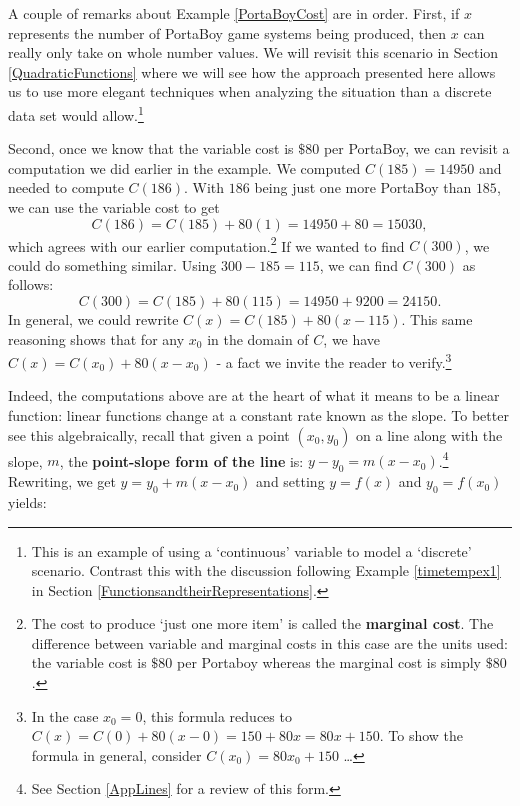 \documentclass{ximera}
\begin{document}
A couple of remarks about Example \ref{PortaBoyCost} are in order.  First, if $x$ represents the number of PortaBoy game systems being produced, then $x$ can really only take on whole number values.  We will revisit this scenario in Section \ref{QuadraticFunctions} where we will see how the approach presented here allows us to use more elegant techniques when analyzing the situation than a discrete data set would allow.\footnote{This is an example of using a `continuous' variable to model a `discrete' scenario.  Contrast this with the discussion following Example \ref{timetempex1} in Section \ref{FunctionsandtheirRepresentations}.} 



Second, once we know that the variable cost is $\$80$ per PortaBoy, we can revisit a computation we did earlier in the example.  We computed $C(185) = 14950$ and needed to compute $C(186)$.  With $186$ being just one more PortaBoy than $185$, we can use the variable cost to get \[C(186) = C(185) + 80(1) =  14950 + 80 = 15030,\] which agrees with our earlier computation.\footnote{The cost to produce `just one more item' is called the  \textbf{marginal cost}.  The difference between variable and marginal costs in this case are the units used: the variable cost is $\$ 80$ per Portaboy whereas the marginal cost is simply $\$80$.}  If we wanted to find $C(300)$, we could do something similar.  Using $300 - 185 = 115$, we can find $C(300)$ as follows: \[C(300) = C(185) + 80(115) = 14950 + 9200 = 24150.\] In general, we could rewrite  $C(x) = C(185) + 80(x - 115)$. This same reasoning shows that for any $x_0$ in the domain of $C$, we have $C(x) = C(x_0) + 80(x - x_0)$ - a fact we invite the reader to verify.\footnote{In the case $x_{0} = 0$, this formula reduces to $C(x) = C(0) + 80(x - 0) = 150 + 80x = 80x + 150$.  To show the formula in general, consider $C(x_{0}) = 80x_{0} + 150$ \ldots}   



Indeed, the computations above are at the heart of what it means to be a linear function: linear functions change at a constant rate known as the slope.  To better see this algebraically, recall that given a point $(x_0, y_0)$ on a line along with the slope, $m$, the {\bf point-slope form of the line} is:  $y - y_0 = m(x - x_0)$.\footnote{See Section \ref{AppLines} for a review of this form.}  Rewriting, we get $y = y_0 + m (x - x_0)$ and setting $y = f(x)$ and $y_0 = f(x_0)$ yields:
\end{document}
